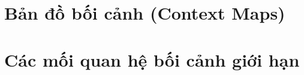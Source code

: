 \documentclass{report} %
\begin{document}




% 


% 


% 


% 
\section{Bản đồ bối cảnh (Context Maps)}
% 
\section{Các mối quan hệ bối cảnh giới hạn}
% 

% 
% 
\end{document}
